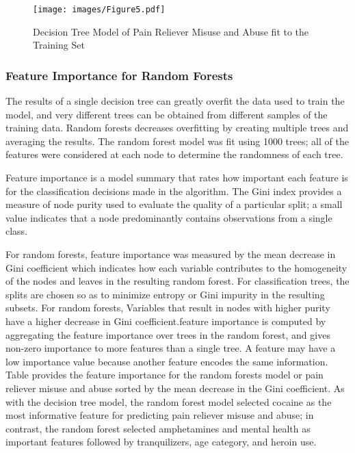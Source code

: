 \documentclass[sigconf]{acmart}
\begin{document}
\begin{figure}[!ht]
  \centering\texttt{[image: images/Figure5.pdf]}
  \caption{Decision Tree Model of Pain Reliever Misuse and Abuse
  fit to the Training Set}
  \label{f:Figure5}
\end{figure}

\subsubsection{Feature Importance for Random Forests}

The results of a single decision tree can greatly overfit the data used
to train the model, and very different trees can be obtained from different
samples of the training data. Random forests decreases overfitting by
creating multiple trees and averaging the results. The random forest model 
was fit using 1000 trees; all of the features were considered at each node 
to determine the randomness of each tree. 


Feature importance is a model summary that rates how important each feature is 
for the classification decisions made in the algorithm. 
The Gini index provides a measure of node purity used to evaluate
the quality of a particular split; a small value indicates that a node 
predominantly contains observations from a single class. 

For random forests, 
feature importance was measured by the mean decrease in Gini coefficient 
which indicates how each variable contributes to the homogeneity of the nodes 
and leaves in the resulting random forest. For classification trees, the splits 
are chosen so as to minimize entropy or Gini impurity in the resulting subsets.
For random forests, Variables that result in nodes with higher purity have a 
higher decrease in Gini coefficient.feature importance is computed by 
aggregating the feature importance over trees in the random forest, and gives 
non-zero importance to more features than a single tree.  A feature may have 
a low importance value because another feature encodes the same information. 
Table  provides the feature importance for the random forests model or pain 
reliever misuse and abuse sorted by the mean decrease in the Gini coefficient. 
As with the decision tree model, the random forest model selected cocaine as
the most informative feature for predicting pain reliever misuse and abuse; 
in contrast, the random forest selected amphetamines and mental health as
important features followed by tranquilizers, age category, and heroin use. 
\end{document}
